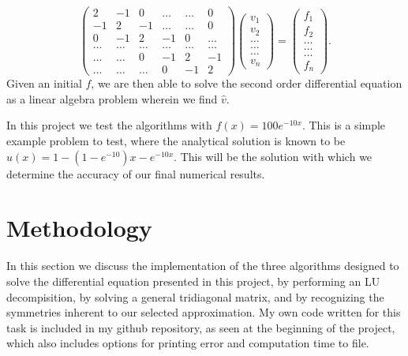 \documentclass[11pt,a4paper]{article}
\begin{document}
\begin{equation}
\left(\begin{array}{cccccc}
			    2 & -1 & 0 & \dots & \dots & 0 \\
			    -1 & 2 & -1 & \dots & \dots & 0 \\
			    0 & -1 & 2 & -1 & 0 & \dots \\
			    \dots & \dots & \dots & \dots & \dots & \dots \\
			    \dots & \dots & 0 & -1 & 2 & -1 \\
                            \dots & \dots & \dots & 0 & -1 & 2 \end{array} \right)
			\left(\begin{array}{c}
			    v_1 \\
			    v_2 \\
			    \dots \\
			    \dots \\
			    \dots \\
			    v_n \end{array} \right)
	=\left(\begin{array}{c}
			    f_1 \\
			    f_2 \\
			    \dots \\
			    \dots \\
			    \dots \\
			    f_n \end{array} \right).
\end{equation}
Given an initial $f$, we are then able to solve the second order differential equation as a linear algebra problem wherein we find $\hat{v}$.

In this project we test the algorithms with $f(x) = 100e^{-10x}$. This is a simple example problem to test, where the analytical solution is known to be $u(x) = 1 - (1-e^{-10}) x - e^{-10x}$. This will be the solution with which we determine the accuracy of our final numerical results.


\section{Methodology}

In this section we discuss the implementation of the three algorithms designed to solve the differential equation presented in this project, by performing an LU decompisition, by solving a general tridiagonal matrix, and by recognizing the symmetries inherent to our selected approximation. My own code written for this task is included in my github repository, as seen at the beginning of the project, which also includes options for printing error and computation time to file. 
\end{document}
